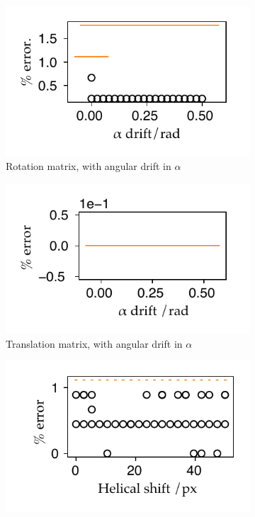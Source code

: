 \begin{figure}
  \centering
    \begin{subfigure}[t]{0.5\textwidth}
      \captionsetup{width=0.8\textwidth}
      \centering
      \includegraphics{Chapters/flopt/Figs/PDF/results/helix/decompose/pc_sum_rot_alpha}
      \caption{Rotation matrix, with angular drift in \(\alpha\)}\label{fig:pc_sum_rot_alpha}
    \end{subfigure}\hfill
    \begin{subfigure}[t]{0.5\textwidth}
      \captionsetup{width=0.8\textwidth}
      \centering
      \includegraphics{Chapters/flopt/Figs/PDF/results/helix/decompose/pc_sum_trans_alpha}
      \caption{Translation matrix, with angular drift in \(\alpha\)}\label{fig:pc_sum_trans_alpha}
    \end{subfigure}
    \bigskip
        \begin{subfigure}[t]{0.5\textwidth}
          \captionsetup{width=0.8\textwidth}
          \centering
          \includegraphics{Chapters/flopt/Figs/PDF/results/helix/decompose/pc_sum_rot_tx}

\end{subfigure}
\end{figure}
